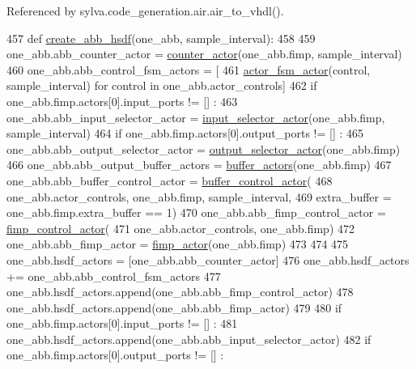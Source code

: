 Referenced by sylva.\+code\+\_\+generation.\+air.\+air\+\_\+to\+\_\+vhdl().


\begin{DoxyCode}
457 \textcolor{keyword}{def }\hyperlink{namespacesylva_1_1code__generation_1_1air_a5a2588aa1c35ad4bd47d3b8f7eeca94a}{create\_abb\_hsdf}(one\_abb, sample\_interval):
458 
459   one\_abb.abb\_counter\_actor = \hyperlink{namespacesylva_1_1code__generation_1_1air_a50394584613c57985bc89c8fa14a058f}{counter\_actor}(one\_abb.fimp, sample\_interval)
460   one\_abb.abb\_control\_fsm\_actors = [
461       \hyperlink{namespacesylva_1_1code__generation_1_1air_a29263a2d50cecb3cf4e5aa3b684c4666}{actor\_fsm\_actor}(control, sample\_interval) \textcolor{keywordflow}{for} control \textcolor{keywordflow}{in} one\_abb.actor\_controls]
462   \textcolor{keywordflow}{if} one\_abb.fimp.actors[0].input\_ports != [] :
463     one\_abb.abb\_input\_selector\_actor = \hyperlink{namespacesylva_1_1code__generation_1_1air_aaa165d9fb26a2af721734a446b1549fa}{input\_selector\_actor}(one\_abb.fimp, 
      sample\_interval)
464   \textcolor{keywordflow}{if} one\_abb.fimp.actors[0].output\_ports != [] :
465     one\_abb.abb\_output\_selector\_actor = \hyperlink{namespacesylva_1_1code__generation_1_1air_a3e01248fb07a8e940919fe35ddcd684e}{output\_selector\_actor}(one\_abb.fimp)
466     one\_abb.abb\_output\_buffer\_actors = \hyperlink{namespacesylva_1_1code__generation_1_1air_a2437e8f4411d574d2a354bee377e1e31}{buffer\_actors}(one\_abb.fimp)
467     one\_abb.abb\_buffer\_control\_actor = \hyperlink{namespacesylva_1_1code__generation_1_1air_a1a46162a8988513e15b0b45a4b456340}{buffer\_control\_actor}(
468       one\_abb.actor\_controls, one\_abb.fimp, sample\_interval,
469       extra\_buffer = one\_abb.fimp.extra\_buffer == 1)
470   one\_abb.abb\_fimp\_control\_actor = \hyperlink{namespacesylva_1_1code__generation_1_1air_a2ea6ae18c1f30dcbc16f01d32d092979}{fimp\_control\_actor}(
471       one\_abb.actor\_controls, one\_abb.fimp)
472   one\_abb.abb\_fimp\_actor = \hyperlink{namespacesylva_1_1code__generation_1_1air_a5a82ebeeb6def57b9dc6784ab9cd43f4}{fimp\_actor}(one\_abb.fimp)
473 
474 
475   one\_abb.hsdf\_actors = [one\_abb.abb\_counter\_actor]
476   one\_abb.hsdf\_actors += one\_abb.abb\_control\_fsm\_actors
477   one\_abb.hsdf\_actors.append(one\_abb.abb\_fimp\_control\_actor)
478   one\_abb.hsdf\_actors.append(one\_abb.abb\_fimp\_actor)
479 
480   \textcolor{keywordflow}{if} one\_abb.fimp.actors[0].input\_ports != [] :
481     one\_abb.hsdf\_actors.append(one\_abb.abb\_input\_selector\_actor)
482   \textcolor{keywordflow}{if} one\_abb.fimp.actors[0].output\_ports != [] :

\end{DoxyCode}
